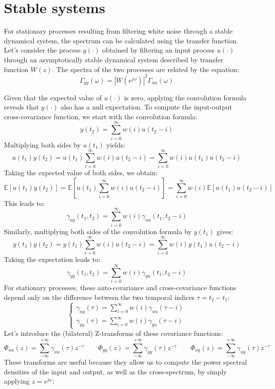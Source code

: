 \section{Stable systems}

For stationary processes resulting from filtering white noise through a stable dynamical system, the spectrum can be calculated using the transfer function.
Let's consider the process $y(\cdot)$ obtained by filtering an input process $u(\cdot)$ through an asymptotically stable dynamical system described by transfer function $W(z)$. 
The spectra of the two processes are related by the equation:
\[\Gamma_{yy}(\omega)=\left\lvert W(e^{j\omega})\right\rvert^2\Gamma_{uu}(\omega)\]

Given that the expected value of $u(\cdot)$ is zero, applying the convolution formula reveals that $y(\cdot)$ also has a null expectation.
To compute the input-output cross-covariance function, we start with the convolution formula:
\[y(t_2)=\sum_{i=0}^\infty w(i)u(t_2-i)\]
Multiplying both sides by $u(t_1)$ yields:
\[u(t_1)y(t_2)=u(t_1)\sum_{i=0}^{\infty}w(i)u(t_2-i)=\sum_{i=0}^\infty w(i)u(t_1)u(t_2-i)\]
Taking the expected value of both sides, we obtain:
\[\mathbb{E}\left[u(t_1)y(t_2)\right]=\mathbb{E}\left[u(t_1)\sum_{i=0}^{\infty}w(i)u(t_2-i)\right]=\sum_{i=0}^\infty w(i) \mathbb{E}\left[u(t_1)u(t_2-i)\right]\]
This leads to:
\[\gamma_{uy}(t_1,t_2)=\sum_{i=0}^\infty w(i)\gamma_{uu}(t_1,t_2-i)\]
Similarly, multiplying both sides of the convolution formula by $y(t_1)$ gives:
\[y(t_1)y(t_2)=y(t_1)\sum_{i=0}^{\infty}w(i)u(t_2-i)=\sum_{i=0}^\infty w(i)y(t_1)u(t_2-i)\]
Taking the expectation leads to:
\[\gamma_{yy}(t_1,t_2)=\sum_{i=0}^\infty w(i)\gamma_{yu}(t_1,t_2-i)\]
For stationary processes, these auto-covariance and cross-covariance functions depend only on the difference between the two temporal indices $\tau = t_2-t_1$:
\[\begin{cases}
    \gamma_{uy}(\tau)=\sum_{i=0}^\infty w(i)\gamma_{uu}(\tau-i) \\
    \gamma_{yy}(\tau)=\sum_{i=0}^\infty w(i)\gamma_{yu}(\tau-i)
\end{cases}\]
Let's introduce the (bilateral) Z-transforms of these covariance functions:
\[\Phi_{uu}(z)=\sum_{-\infty}^{+\infty}\gamma_{uu}(\tau)z^{-\tau} \qquad \Phi_{yy}(z)=\sum_{-\infty}^{+\infty}\gamma_{yy}(\tau)z^{-\tau} \qquad \Phi_{uy}(z)=\sum_{-\infty}^{+\infty}\gamma_{uy}(\tau)z^{-\tau}\]
These transforms are useful because they allow us to compute the power spectral densities of the input and output, as well as the cross-spectrum, by simply applying $z=e^{j\omega}$:
